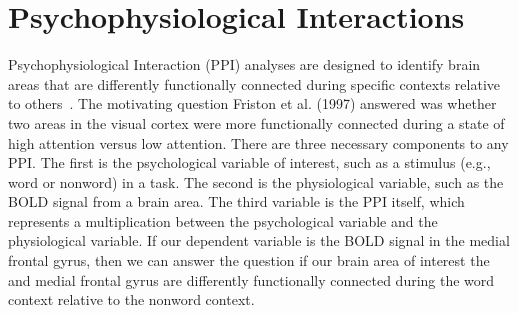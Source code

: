 \documentclass[phd,appendix,figures]{uithesis}
\begin{document}
\section{Psychophysiological Interactions}

Psychophysiological Interaction (PPI) analyses are designed to 
identify brain areas that are differently functionally connected
during specific contexts relative to others~\cite{Friston1997}.
The motivating question Friston et al. (1997) answered was whether
two areas in the visual cortex were more functionally connected during a state
of high attention versus low attention.
There are three necessary components to any PPI.
The first is the psychological variable of interest, such as a stimulus (e.g., word or nonword)
in a task.
The second is the physiological variable, such as the BOLD signal from
a brain area.
The third variable is the PPI itself, which represents a multiplication
between the psychological variable and the physiological variable.
If our dependent variable is the BOLD signal in the medial frontal gyrus,
then we can answer the question if our brain area of interest the and medial frontal gyrus
are differently functionally connected during the word context relative
to the nonword context.
\end{document}
